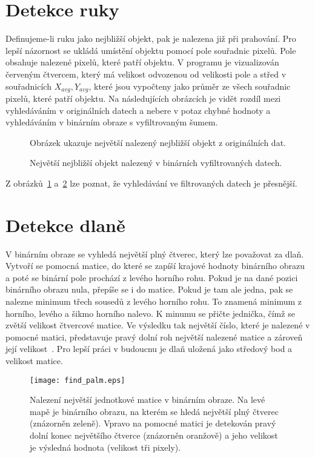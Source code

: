 \section{Detekce ruky}
Definujeme-li ruku jako nejbližší objekt, pak je nalezena již při prahování. Pro lepší názornost se ukládá umístění objektu pomocí pole souřadnic pixelů. Pole obsahuje nalezené pixelů, které patří objektu. V programu je vizualizován červeným čtvercem, který má velikost odvozenou od velikosti pole a střed v souřadnicích $ X_{avg}, Y_{avg} $, které jsou vypočteny jako průměr ze všech souřadnic pixelů, které patří objektu. 
Na následujících obrázcích je vidět rozdíl mezi vyhledáváním v originálních datech a nebere v potaz chybné hodnoty a vyhledáváním v binárním obraze s vyfiltrovaným šumem.
\begin{figure}[htp]
\centering
{}
\caption{Obrázek ukazuje největší nalezený nejbližší objekt z originálních dat.}
\label{pic15}
\end{figure}
\begin{figure}[htp]
\centering
{}
\caption{Největší nejbližší objekt nalezený v binárních vyfiltrovaných datech.}
\label{pic16}
\end{figure}

Z obrázků~\ref{pic15} a~\ref{pic16} lze poznat, že vyhledávání ve filtrovaných datech je přesnější.
\newpage
\section{Detekce dlaně}
V binárním obraze se vyhledá největší plný čtverec, který lze považovat za dlaň. Vytvoří se pomocná matice, do které se zapíší krajové hodnoty binárního obrazu a poté se binární pole prochází z levého horního rohu. Pokud je na dané pozici binárního obrazu nula, přepíše se i do matice. Pokud je tam ale jedna, pak se nalezne minimum třech sousedů z levého horního rohu. To znamená minimum z horního, levého a šikmo horního nalevo. K minumu se přičte jednička, čímž se zvětší velikost čtvercové matice. Ve výsledku tak největší číslo, které je nalezené v pomocné matici, představuje pravý dolní roh největší nalezené matice a zároveň její velikost~\cite{23}. Pro lepší práci v budoucnu je dlaň uložená jako středový bod a velikost matice.

\begin{figure} [htp]
\centering
\texttt{[image: find\_palm.eps]}
\centering
\caption{Nalezení největší jednotkové matice v binárním obraze. Na levé mapě je binárního obrazu, na kterém se hledá největší plný čtverec (znázorněn zeleně). Vpravo na pomocné matici je detekován pravý dolní konec největšího čtverce (znázorněn oranžově) a jeho velikost je výsledná hodnota (velikost tři pixely). }
\label{pic17}
\end{figure}

